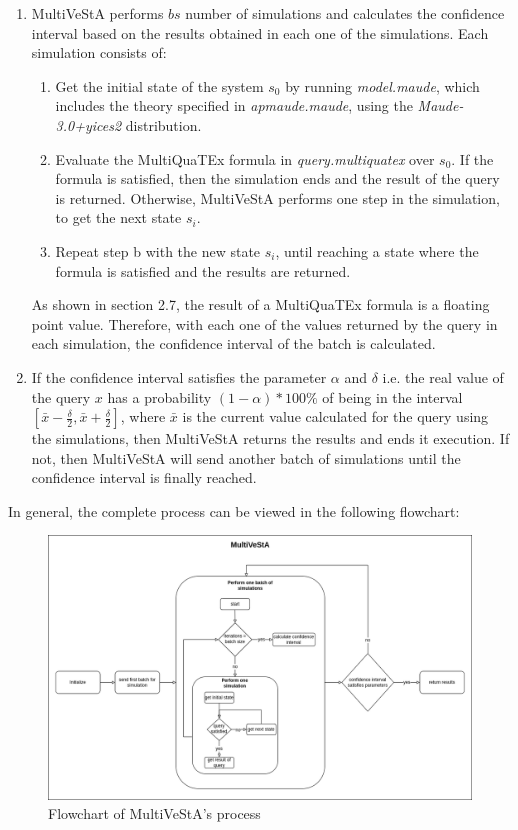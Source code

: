 \begin{enumerate}
    \item MultiVeStA performs $bs$ number of simulations and calculates the confidence interval based on the results obtained in each one of the simulations. Each simulation consists of:
        \begin{enumerate}
            \item Get the initial state of the system $s_0$ by running \textit{model.maude}, which includes the theory specified in \textit{apmaude.maude}, using the \textit{Maude-3.0+yices2} distribution.
            \item Evaluate the MultiQuaTEx formula in \textit{query.multiquatex} over $s_0$. If the formula is satisfied, then the simulation ends and the result of the query is returned. Otherwise, MultiVeStA performs one step in the simulation, to get the next state $s_i$.
            \item Repeat step b with the new state $s_i$, until reaching a state where the formula is satisfied and the results are returned. 
        \end{enumerate}
    As shown in section 2.7, the result of a MultiQuaTEx formula is a floating point value. Therefore, with each one of the values returned by the query in each simulation, the confidence interval of the batch is calculated.
    
    \item If the confidence interval satisfies the parameter $\alpha$ and $\delta$ i.e. the real value of the query $x$ has a probability $(1-\alpha)*100\%$ of being in the interval $[\bar{x} - \frac{\delta}{2},\bar{x} + \frac{\delta}{2}]$, where $\bar{x}$ is the current value calculated for the query using the simulations, then MultiVeStA returns the results and ends it execution. If not, then MultiVeStA will send another batch of simulations until the confidence interval is finally reached.
\end{enumerate}
In general, the complete process can be viewed in the following flowchart:
\begin{figure}[H]
    \centering
    \includegraphics[scale = 0.4]{images/multi3.png}
    \caption{Flowchart of MultiVeStA's process}
    \label{fig:multi3}
\end{figure}

